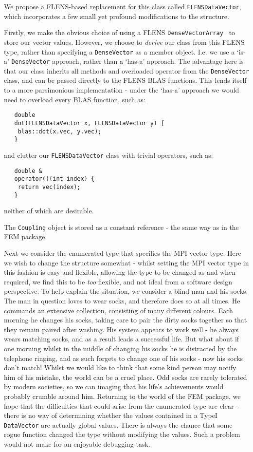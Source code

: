 We propose a FLENS-based replacement for this class called \texttt{FLENSDataVector}, which incorporates a few small yet profound modifications to the structure.

Firstly, we make the obvious choice of using a FLENS \texttt{DenseVector\<Array\<\double\> \>} to store our vector values. However, we choose to \emph{derive} our class from this FLENS type, rather than specifying a \texttt{DenseVector} as a member object. I.e. we use a `is-a' \texttt{DenseVector} approach, rather than a `has-a' approach. The advantage here is that our class inherits all methods and overloaded operator from the \texttt{DenseVector} class, and can be passed directly to the FLENS BLAS functions. This lends itself to a more parsimonious implementation - under the `has-a' approach we would need to overload every BLAS function, such as: 
\begin{lstlisting}
   double
   dot(FLENSDataVector x, FLENSDataVector y) {
   	blas::dot(x.vec, y.vec);
   }
\end{lstlisting}

and clutter our \texttt{FLENSDataVector} class with trivial operators, such as:

\begin{lstlisting}
   double &
   operator()(int index) {
   	return vec(index);
   }
\end{lstlisting}

neither of which are desirable.

The \texttt{Coupling} object is stored as a constant reference - the same way as in the FEM package.

Next we consider the enumerated type that specifies the MPI vector type. Here we wish to change the structure somewhat - whilst setting the MPI vector type in this fashion is easy and flexible, allowing the type to be changed as and when required, we find this to be \emph{too} flexible, and not ideal from a software design perspective. To help explain the situation, we consider a blind man and his socks. The man in question loves to wear socks, and therefore does so at all times. He commands an extensive collection, consisting of many different colours. Each morning he changes his socks, taking care to pair the dirty socks together so that they remain paired after washing. His system appears to work well - he always wears matching socks, and as a result leads a successful life. But what about if one morning whilst in the middle of changing his socks he is distracted by the telephone ringing, and as such forgets to change one of his socks - now his socks don't match! Whilst we would like to think that some kind person may notify him of his mistake, the world can be a cruel place. Odd socks are rarely tolerated by modern societies, so we can imaging that his life's achievements would probably crumble around him. Returning to the world of the FEM package, we hope that the difficulties that could arise from the enumerated type are clear - there is no way of determining whether the values contained in a TypeI \texttt{DataVector} are actually global values. There is always the chance that some rogue function changed the type without modifying the values. Such a problem would not make for an enjoyable debugging task.

